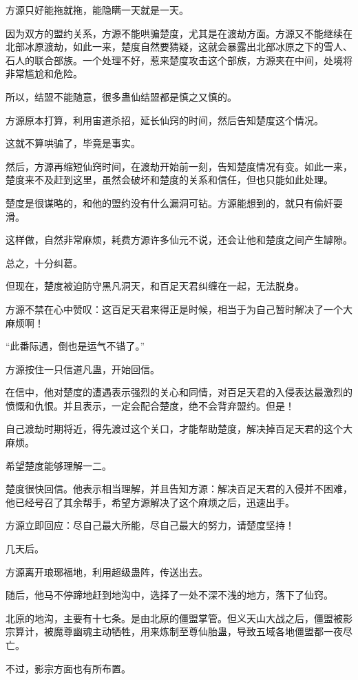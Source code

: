 \begin{this_body}
方源只好能拖就拖，能隐瞒一天就是一天。

因为双方的盟约关系，方源不能哄骗楚度，尤其是在渡劫方面。方源又不能继续在北部冰原渡劫，如此一来，楚度自然要猜疑，这就会暴露出北部冰原之下的雪人、石人的联合部族。一个处理不好，惹来楚度攻击这个部族，方源夹在中间，处境将非常尴尬和危险。

所以，结盟不能随意，很多蛊仙结盟都是慎之又慎的。

方源原本打算，利用宙道杀招，延长仙窍的时间，然后告知楚度这个情况。

这就不算哄骗了，毕竟是事实。

然后，方源再缩短仙窍时间，在渡劫开始前一刻，告知楚度情况有变。如此一来，楚度来不及赶到这里，虽然会破坏和楚度的关系和信任，但也只能如此处理。

楚度是很谋略的，和他的盟约没有什么漏洞可钻。方源能想到的，就只有偷奸耍滑。

这样做，自然非常麻烦，耗费方源许多仙元不说，还会让他和楚度之间产生罅隙。

总之，十分纠葛。

但现在，楚度被迫防守黑凡洞天，和百足天君纠缠在一起，无法脱身。

方源不禁在心中赞叹：这百足天君来得正是时候，相当于为自己暂时解决了一个大麻烦啊！

“此番际遇，倒也是运气不错了。”

方源按住一只信道凡蛊，开始回信。

在信中，他对楚度的遭遇表示强烈的关心和同情，对百足天君的入侵表达最激烈的愤慨和仇恨。并且表示，一定会配合楚度，绝不会背弃盟约。但是！

自己渡劫时期将近，得先渡过这个关口，才能帮助楚度，解决掉百足天君的这个大麻烦。

希望楚度能够理解一二。

楚度很快回信。他表示相当理解，并且告知方源：解决百足天君的入侵并不困难，他已经号召了其余帮手，希望方源解决了这个麻烦之后，迅速出手。

方源立即回应：尽自己最大所能，尽自己最大的努力，请楚度坚持！

几天后。

方源离开琅琊福地，利用超级蛊阵，传送出去。

随后，他马不停蹄地赶到地沟中，选择了一处不深不浅的地方，落下了仙窍。

北原的地沟，主要有十七条。是由北原的僵盟掌管。但义天山大战之后，僵盟被影宗算计，被魔尊幽魂主动牺牲，用来炼制至尊仙胎蛊，导致五域各地僵盟都一夜尽亡。

不过，影宗方面也有所布置。


\end{this_body}
